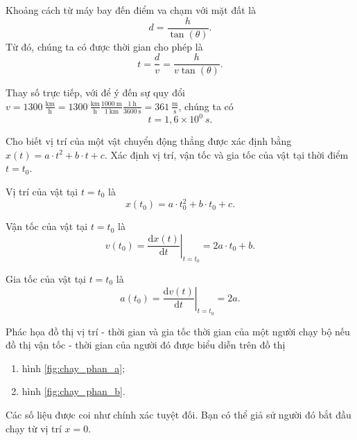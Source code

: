 \documentclass[a4paper, titlepage, openany]{book}
\newcounter{exercise}
\newcounter{solution}
\numberwithin{equation}{chapter}
\begin{document}
\solution

Khoảng cách từ máy bay đến điểm va chạm với mặt đất là $$d=\frac{h}{\tan{(\theta)}}.$$ Từ đó, chúng ta có được thời gian cho phép là $$t=\frac{d}{v}=\frac{h}{v\tan{(\theta)}}.$$

Thay số trực tiếp, với để ý đến sự quy đổi $v=1300\ \frac{\text{km}}{\text{h}}=1300\ \frac{\text{km}}{\text{h}}\frac{1000\ \text{m}}{1\ \text{km}}\frac{1\ \text{h}}{3600\ \text{s}}=361\ \frac{\text{m}}{\text{s}}$, chúng ta có $$t=\boxed{1{,}6\times 10^0\ s}.$$

\exercise Cho biết vị trí của một vật chuyển động thẳng được xác định bằng $x(t) = a\cdot t^2+b\cdot t+c$. Xác định vị trí, vận tốc và gia tốc của vật tại thời điểm $t=t_0$.

\solution

Vị trí của vật tại $t=t_0$ là $$x\left(t_0\right)=\boxed{a\cdot t_0^2+b\cdot t_0+c}.$$

Vận tốc của vật tại $t=t_0$ là $$v\left(t_0\right)=\left.\frac{\mathrm{d}x(t)}{\mathrm{d}t}\right|_{t=t_0}=\boxed{2a\cdot t_0+b}.$$

Gia tốc của vật tại $t=t_0$ là $$a\left(t_0\right)=\left.\frac{\mathrm{d}v(t)}{\mathrm{d}t}\right|_{t=t_0}=\boxed{2a}.$$

\exercise Phác họa đồ thị vị trí - thời gian và gia tốc thời gian của một người chạy bộ nếu đồ thị vận tốc - thời gian của người đó được biểu diễn trên đồ thị
\begin{enumerate}
   \item hình \ref{fig:chay_phan_a};
   \item hình \ref{fig:chay_phan_b}.
\end{enumerate}
Các số liệu được coi như chính xác tuyệt đối. Bạn có thể giả sử người đó bắt đầu chạy từ vị trí $x = 0$.
\end{document}
